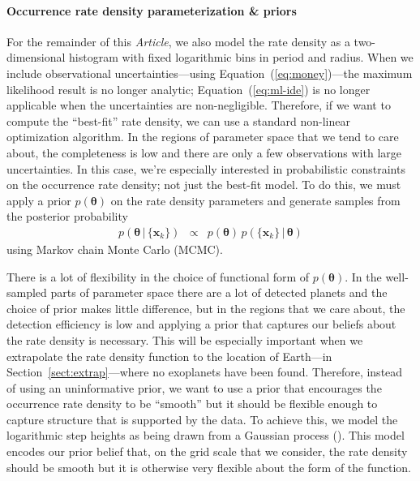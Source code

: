 \documentclass[12pt,preprint]{aastex}
\newcommand{\paper}{\textsl{Article}}
\newcommand{\Eq}[1]{Equation~(\ref{eq:#1})}
\newcommand{\eq}[1]{\Eq{#1}}
\newcommand{\eqlabel}[1]{\label{eq:#1}}
\newcommand{\Sect}[1]{Section~\ref{sect:#1}}
\newcommand{\sect}[1]{\Sect{#1}}
\newcommand{\bvec}[1]{\ensuremath{\boldsymbol{#1}}}
\newcommand{\ratepar}{{\ensuremath{\theta}}}
\newcommand{\ratepars}{{\ensuremath{\bvec{\ratepar}}}}
\newcommand{\data}{{\ensuremath{\bvec{x}}}}
\begin{document}
\paragraph{Occurrence rate density parameterization \& priors}
For the remainder of this \paper, we also model the rate density as a
two-dimensional histogram with fixed logarithmic bins in period and radius.
When we include observational uncertainties---using \eq{money}---the maximum
likelihood result is no longer analytic; \eq{ml-ide} is no longer applicable
when the uncertainties are non-negligible.
Therefore, if we want to compute the ``best-fit'' rate density, we can use a
standard non-linear optimization algorithm.
In the regions of parameter space that we tend to care about, the completeness
is low and there are only a few observations with large uncertainties.
In this case, we're especially interested in probabilistic constraints on the
occurrence rate density; not just the best-fit model.
To do this, we must apply a prior $p(\ratepars)$ on the rate density
parameters and generate samples from the posterior probability
\begin{eqnarray}\eqlabel{posterior}
p(\ratepars\,|\,\{\data_k\}) &\propto&
    p(\ratepars)\,p(\{\data_k\}\,|\,\ratepars)
\end{eqnarray}
using Markov chain Monte Carlo (MCMC).

There is a lot of flexibility in the choice of functional form of
$p(\ratepars)$.
In the well-sampled parts of parameter space there are a lot of
detected planets and the choice of prior makes little difference, but in the
regions that we care about, the detection efficiency is low and applying a
prior that captures our beliefs about the rate density is necessary.
This will be especially important when we extrapolate the rate density
function to the location of Earth---in \sect{extrap}---where no exoplanets
have been found.
Therefore, instead of using an uninformative prior, we want to use a prior
that encourages the occurrence rate density to be ``smooth'' but it should be
flexible enough to capture structure that is supported by the data.
To achieve this, we model the logarithmic step heights as being drawn from a
Gaussian process (\citealt{gp, gibson-gp, dfm-gp}).
This model encodes our prior belief that, on the grid scale that we consider,
the rate density should be smooth but it is otherwise very flexible about the
form of the function.
\end{document}
